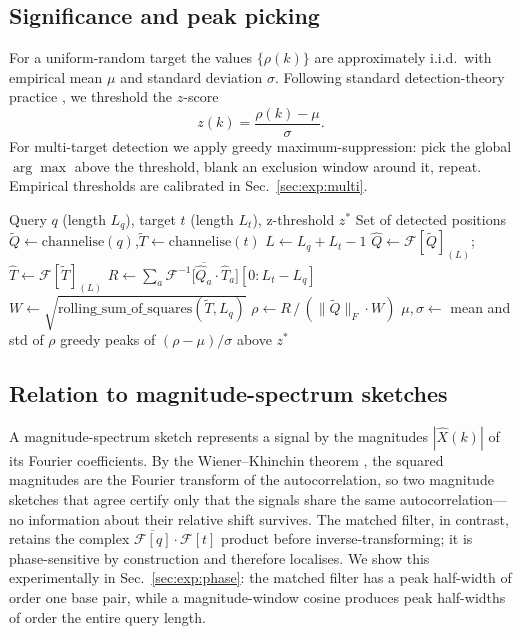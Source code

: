 \documentclass[twocolumn,11pt,a4paper]{article}
\theoremstyle{definition}
\theoremstyle{remark}
\newcommand{\F}{\mathcal{F}}
\begin{document}
\subsection{Significance and peak picking}

For a uniform-random target the values $\{\rho(k)\}$ are approximately
i.i.d.\ with empirical mean $\mu$ and standard deviation $\sigma$.
Following standard detection-theory practice
\citep{neyman1933, kay1998}, we threshold the $z$-score
\begin{equation}
    z(k) = \frac{\rho(k) - \mu}{\sigma}.
\end{equation}
For multi-target detection we apply greedy maximum-suppression: pick the
global $\arg\max$ above the threshold, blank an exclusion window around
it, repeat. Empirical thresholds are calibrated in
Sec.~\ref{sec:exp:multi}.

\begin{algorithm}[t]
\caption{Multi-channel matched filter for sequence matching.}
\label{alg:filter}
\begin{algorithmic}[1]
\Require Query $q$ (length $L_q$), target $t$ (length $L_t$), z-threshold $z^*$
\Ensure Set of detected positions
\State $\tilde Q \gets \mathrm{channelise}(q)$,\quad $\tilde T \gets \mathrm{channelise}(t)$
\State $L \gets L_q + L_t - 1$
\State $\hat Q \gets \F[\tilde Q]_{(L)}$;\quad $\hat T \gets \F[\tilde T]_{(L)}$
\State $R \gets \sum_a \F^{-1}\!\big[\overline{\hat Q_a} \cdot \hat T_a\big][0 : L_t - L_q]$
\State $W \gets \sqrt{\mathrm{rolling\_sum\_of\_squares}(\tilde T, L_q)}$
\State $\rho \gets R \,/\, (\|\tilde Q\|_F \cdot W)$
\State $\mu, \sigma \gets$ mean and std of $\rho$
\State \Return greedy peaks of $(\rho - \mu)/\sigma$ above $z^*$
\end{algorithmic}
\end{algorithm}

\subsection{Relation to magnitude-spectrum sketches}
\label{sec:method:phase}

A magnitude-spectrum sketch represents a signal by the magnitudes
$|\hat X(k)|$ of its Fourier coefficients. By the Wiener--Khinchin
theorem \citep{wiener1930, khinchin1934}, the squared magnitudes are
the Fourier transform of the autocorrelation, so two magnitude
sketches that agree certify only that the signals share the same
autocorrelation---no information about their relative shift survives.
The matched filter, in contrast, retains the complex
$\overline{\F[q]} \cdot \F[t]$ product before inverse-transforming; it
is phase-sensitive by construction and therefore localises. We show
this experimentally in Sec.~\ref{sec:exp:phase}: the matched filter has
a peak half-width of order one base pair, while a magnitude-window
cosine produces peak half-widths of order the entire query length.
\end{document}
